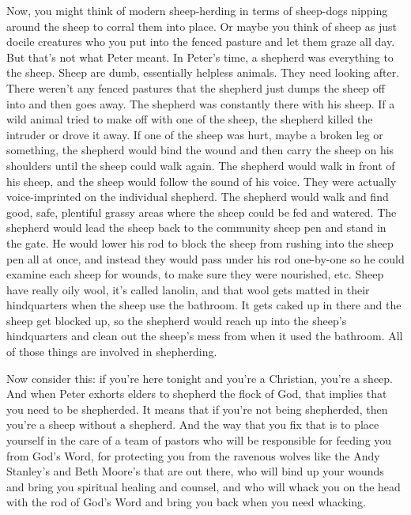 \documentclass[letterpaper, 12pt]{article}
\begin{document}
    Now, you might think of modern sheep-herding in terms of sheep-dogs
    nipping around the sheep to corral them into place. Or maybe you
    think of sheep as just docile creatures who you put into the fenced
    pasture and let them graze all day. But that's not what Peter meant.
    In Peter's time, a shepherd was everything to the sheep. Sheep are
    dumb, essentially helpless animals. They need looking after. There
    weren't any fenced pastures that the shepherd just dumps the sheep
    off into and then goes away. The shepherd was constantly there with
    his sheep. If a wild animal tried to make off with one of the sheep,
    the shepherd killed the intruder or drove it away. If one of the
    sheep was hurt, maybe a broken leg or something, the shepherd would
    bind the wound and then carry the sheep on his shoulders until the
    sheep could walk again. The shepherd would walk in front of his
    sheep, and the sheep would follow the sound of his voice. They were
    actually voice-imprinted on the individual shepherd. The shepherd
    would walk and find good, safe, plentiful grassy areas where the
    sheep could be fed and watered. The shepherd would lead the sheep
    back to the community sheep pen and stand in the gate. He would
    lower his rod to block the sheep from rushing into the sheep pen all
    at once, and instead they would pass under his rod one-by-one so he
    could examine each sheep for wounds, to make sure they were
    nourished, etc. Sheep have really oily wool, it's called lanolin,
    and that wool gets matted in their hindquarters when the sheep use
    the bathroom. It gets caked up in there and the sheep get blocked
    up, so the shepherd would reach up into the sheep's hindquarters and
    clean out the sheep's mess from when it used the bathroom. All of
    those things are involved in shepherding.

    Now consider this: if you're here tonight and you're a Christian,
    you're a sheep. And when Peter exhorts elders to shepherd the flock
    of God, that implies that you need to be shepherded. It means that
    if you're not being shepherded, then you're a sheep without a
    shepherd.  And the way that you fix that is to place yourself in the
    care of a team of pastors who will be responsible for feeding you
    from God's Word, for protecting you from the ravenous wolves like
    the Andy Stanley's and Beth Moore's that are out there, who will
    bind up your wounds and bring you spiritual healing and counsel, and
    who will whack you on the head with the rod of God's Word and bring
    you back when you need whacking.
\end{document}
